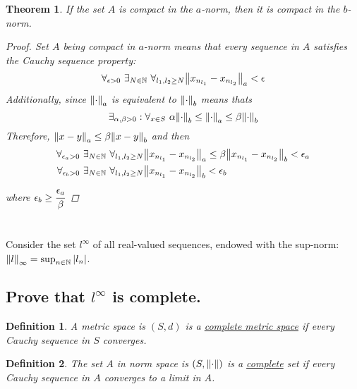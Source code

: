 \documentclass[]{article}
\newcommand{\N}{\mathbb{N}}
\newtheorem{definition}{Definition}
\newtheorem{theorem}{Theorem}
\begin{document}
\begin{theorem}
    If the set $A$ is compact in the $a$-norm, then it is compact in the $b$-norm.
    \begin{proof}
        Set $A$ being compact in $a$-norm means that every sequence in $A$ satisfies the Cauchy sequence property:
        \[
            \forall_{\epsilon>0} \ \exists_{N \in \N} \ \forall_{l_1,l_2 \geq N} \norm{x_{n_{l_1}} - x_{n_{l_2}}}_a < \epsilon
        \]
        Additionally, since $\norm{\cdot}_a$ is equivalent to $\norm{\cdot}_b$ means thats
        \[
            \exists_{\alpha,\beta > 0} : \forall_{x\in S} \ \alpha \norm{\cdot}_b \leq \norm{\cdot}_a \leq \beta \norm{\cdot}_b
        \]
        Therefore, $\norm{x - y}_a \leq \beta \norm{x-y}_b$ and then 
        \begin{align*}
            \forall_{\epsilon_a>0} \ \exists_{N \in \N} \ \forall_{l_1,l_2 \geq N} 
            &\norm{x_{n_{l_1}} - x_{n_{l_2}}}_a \leq \beta \norm{x_{n_{l_1}} - x_{n_{l_2}}}_b < \epsilon_a\\
            \forall_{\epsilon_b>0} \ \exists_{N \in \N} \ \forall_{l_1,l_2 \geq N} 
            &\norm{x_{n_{l_1}} - x_{n_{l_2}}}_b < \epsilon_b
        \end{align*}
        where $ \epsilon_b \geq \cfrac{\epsilon_a}{\beta}$
    \end{proof}
\end{theorem}

\newpage
\section{}
Consider the set $l^{\infty}$ of all real-valued sequences, endowed with the sup-norm: $\norm{l}_\infty = \sup_{n\in \N} \abs{l_n}$.

\subsection{Prove that $l^\infty$ is complete.}

\begin{definition}
    A metric space is $(S,d)$ is a \underline{complete metric space} if every Cauchy sequence in $S$ converges.
\end{definition}
\begin{definition}
    The set $A$ in norm space is $(S,\norm{\cdot})$ is a \underline{complete} set if every Cauchy sequence in $A$ converges to a limit in $A$.
\end{definition}
\end{document}
